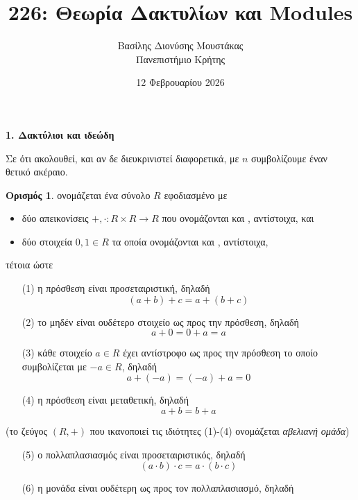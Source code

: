 \documentclass[12pt,a4paper,reqno]{amsart}
\title{226: Θεωρία Δακτυλίων και Modules}
\author[Β.~Δ. Μουστακας]{Βασίλης Διονύσης Μουστάκας \\ Πανεπιστήμιο Κρήτης}
\date{12 Φεβρουαρίου 2026}
\theoremstyle{definition}
\newtheorem{definition}[theorem]{Ορισμός}
\theoremstyle{remark}
\numberwithin{theorem}{section}
\numberwithin{exercise}{section}
\numberwithin{equation}{section}
\renewcommand{\to}{\rightarrow}
\newcommand{\defn}[1]{{\color{mylightblue}{#1}}}
\begin{document}
\begingroup
\def\uppercasenonmath#1{} %
\let\MakeUppercase\relax %
\maketitle
\endgroup

\setcounter{section}{1}
\begin{center}
    \textbf{1. Δακτύλιοι και ιδεώδη
}
\end{center}

Σε ότι ακολουθεί, και αν δε διευκρινιστεί διαφορετικά, με $n$ συμβολίζουμε έναν θετικό ακέραιο.

\begin{definition}
    \label{def:ring}
    \defn{Δακτύλιος} ονομάζεται ένα σύνολο $R$ εφοδιασμένο με 
    \begin{itemize}
        \item δύο απεικονίσεις $+, \cdot : R \times R \to R$ που ονομάζονται \defn{πρόσθεση} και \defn{πολλαπλασιασμός}, αντίστοιχα, και
        \item δύο στοιχεία $0, 1 \in R$ τα οποία ονομάζονται \defn{μηδέν} και \defn{μονάδα}, αντίστοιχα,
    \end{itemize}
    τέτοια ώστε 
    \begin{itemize}
        \item[(1)] η πρόσθεση είναι προσεταιριστική, δηλαδή 
        \[
        (a + b) + c = a + (b + c)
        \]
        \item[(2)] το μηδέν είναι ουδέτερο στοιχείο ως προς την πρόσθεση, δηλαδή 
        \[
        a + 0 = 0 + a = a
        \]
        \item[(3)] κάθε στοιχείο $a \in R$ έχει αντίστροφο ως προς την πρόσθεση το οποίο συμβολίζεται με $-a \in R$, δηλαδή 
        \[
        a + (-a) = (-a) + a = 0
        \]
        \item[(4)] η πρόσθεση είναι μεταθετική, δηλαδή 
        \[
        a + b = b + a
        \]
    \end{itemize}
    (το ζεύγος $(R,+)$ που ικανοποιεί τις ιδιότητες (1)-(4) ονομάζεται \emph{αβελιανή ομάδα})
    \begin{itemize}
        \item[(5)] ο πολλαπλασιασμός είναι προσεταιριστικός, δηλαδή 
        \[
        (a \cdot b)\cdot c = a\cdot(b \cdot c)
        \]
        \item[(6)] η μονάδα είναι ουδέτερη ως προς τον πολλαπλασιασμό, δηλαδή 

\end{itemize}
\end{definition}
\end{document}
